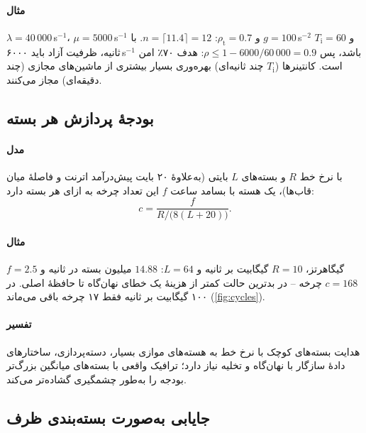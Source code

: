 \documentclass[11pt,a4paper]{article}
\begin{document}
\paragraph{مثال} $\lambda = 40\,000$\,s$^{-1}$، $\mu = 5000$\,s$^{-1}$ و $\rho_{\mathrm{t}} = 0.7$: $n = \lceil 11.4\rceil = 12$. با
$g = 100$\,s$^{-2}$ و $T_\mathrm{i} = 60$ ثانیه، ظرفیت آزاد باید ۶۰۰۰\,s$^{-1}$ باشد، پس $\rho \le 1 - 6000/60\,000 = 0.9$: هدف ۷۰٪
امن است. کانتینرها ($T_\mathrm{i}$ چند ثانیه‌ای) بهره‌وری بسیار بیشتری از ماشین‌های مجازی (چند دقیقه‌ای) مجاز می‌کنند.

\subsection{بودجهٔ پردازش هر بسته}\label{sec:cycles}
\paragraph{مدل} با نرخ خط $R$ و بسته‌های $L$ بایتی (به‌علاوهٔ ۲۰ بایت پیش‌درآمد اترنت و فاصلهٔ میان قاب‌ها)، یک هسته با
بسامد ساعت $f$ این تعداد چرخه به ازای هر بسته دارد:
\begin{equation}\label{eq:cycles}
  c = \frac{f}{R/\bigl(8(L+20)\bigr)} .
\end{equation}
\paragraph{مثال} $f = 2.5$ گیگاهرتز، $R = 10$ گیگابیت بر ثانیه و $L = 64$: $14.88$ میلیون بسته در ثانیه و $c = 168$ چرخه --
در بدترین حالت کمتر از هزینهٔ یک خطای نهان‌گاه تا حافظهٔ اصلی. در ۱۰۰ گیگابیت بر ثانیه فقط ۱۷ چرخه باقی می‌ماند
(\cref{fig:cycles}).
\paragraph{تفسیر} هدایت بسته‌های کوچک با نرخ خط به هسته‌های موازی بسیار، دسته‌پردازی، ساختارهای دادهٔ سازگار با نهان‌گاه و
تخلیه نیاز دارد؛ ترافیک واقعی با بسته‌های میانگین بزرگ‌تر بودجه را به‌طور چشمگیری گشاده‌تر می‌کند.

\begin{acnfigure}
  \caption{چرخه‌های در دسترس به ازای هر بسته روی یک هستهٔ ۲٫۵ گیگاهرتزی با نرخ خط (\cref{eq:cycles}).}
  \label{fig:cycles}
\end{acnfigure}

\subsection{جایابی به‌صورت بسته‌بندی ظرف}\label{sec:pack}
\end{document}
